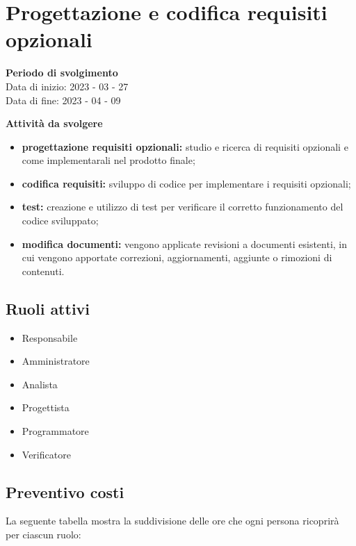 \section{Progettazione e codifica requisiti opzionali}

\textbf{Periodo di svolgimento}
\\ Data di inizio: 2023 - 03 - 27 \\ Data di fine: 2023 - 04 - 09

\textbf{Attività da svolgere}
    \begin{itemize}
        \item \textbf{progettazione requisiti opzionali:} studio e ricerca di requisiti opzionali e come implementarali nel prodotto finale; 
        \item \textbf{codifica requisiti:} sviluppo di codice per implementare i requisiti opzionali;
        \item \textbf{test:} creazione e utilizzo di test per verificare il corretto funzionamento del codice sviluppato;
        \item \textbf{modifica documenti:} vengono applicate revisioni a documenti esistenti, in cui vengono apportate correzioni, aggiornamenti, aggiunte o rimozioni di contenuti.
    \end{itemize}

\subsection{Ruoli attivi}
\begin{itemize}
    \item Responsabile 
    \item Amministratore 
    \item Analista 
    \item Progettista 
    \item Programmatore 
    \item Verificatore 
\end{itemize}

\subsection{Preventivo costi}

La seguente tabella mostra la suddivisione delle ore che ogni persona ricoprirà per ciascun ruolo:

